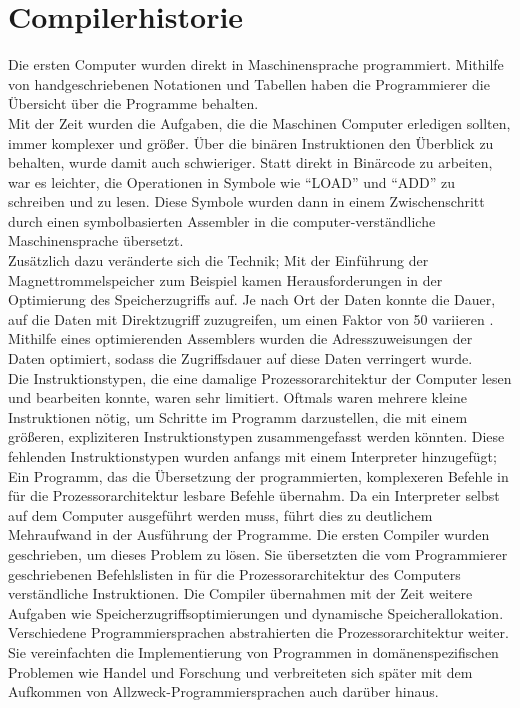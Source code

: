 \section{Compilerhistorie}

Die ersten Computer wurden direkt in Maschinensprache programmiert.
Mithilfe von handgeschriebenen Notationen und Tabellen haben die Programmierer die Übersicht über
die Programme behalten.\\
Mit der Zeit wurden die Aufgaben, die die Maschinen Computer erledigen sollten, immer komplexer und größer.
Über die binären Instruktionen den Überblick zu behalten, wurde damit auch schwieriger.
Statt direkt in Binärcode zu arbeiten, war es leichter, die Operationen in Symbole wie ``LOAD'' und ``ADD'' zu schreiben und zu lesen.
Diese Symbole wurden dann in einem Zwischenschritt durch einen symbolbasierten Assembler in die computer-verständliche Maschinensprache übersetzt.\\
Zusätzlich dazu veränderte sich die Technik; 
Mit der Einführung der Magnettrommelspeicher zum Beispiel kamen Herausforderungen in der Optimierung des Speicherzugriffs auf.
Je nach Ort der Daten konnte die Dauer, auf die Daten mit Direktzugriff zuzugreifen, um einen Faktor von 50 variieren \cite{calingaert:1979}.
Mithilfe eines optimierenden Assemblers wurden die Adresszuweisungen der Daten optimiert, sodass die Zugriffsdauer auf diese Daten verringert wurde.\\
Die Instruktionstypen, die eine damalige Prozessorarchitektur der Computer lesen und bearbeiten konnte, waren sehr limitiert.
Oftmals waren mehrere kleine Instruktionen nötig, um Schritte im Programm darzustellen, die mit einem größeren, expliziteren Instruktionstypen
zusammengefasst werden könnten.
Diese fehlenden Instruktionstypen wurden anfangs mit einem Interpreter hinzugefügt; Ein Programm, das die Übersetzung der programmierten, komplexeren Befehle
in für die Prozessorarchitektur lesbare Befehle übernahm.
Da ein Interpreter selbst auf dem Computer ausgeführt werden muss, führt dies zu deutlichem Mehraufwand in der Ausführung der Programme.
Die ersten Compiler wurden geschrieben, um dieses Problem zu lösen.
Sie übersetzten die vom Programmierer geschriebenen Befehlslisten in für die Prozessorarchitektur des Computers verständliche Instruktionen.
Die Compiler übernahmen mit der Zeit weitere Aufgaben wie Speicherzugriffsoptimierungen und dynamische Speicherallokation.
Verschiedene Programmiersprachen abstrahierten die Prozessorarchitektur weiter.
Sie vereinfachten die Implementierung von Programmen in domänenspezifischen Problemen wie Handel und Forschung und verbreiteten sich später mit dem Aufkommen von Allzweck-Programmiersprachen auch darüber hinaus\cite{calingaert:1979}.

